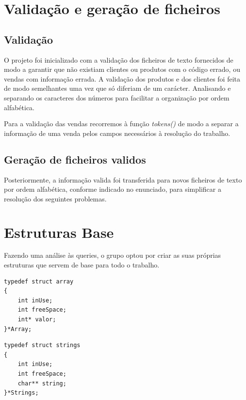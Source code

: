 \documentclass[a4paper]{report} %
\begin{document}
\chapter{Validação e geração de ficheiros}


\section{Validação}
\par O projeto foi inicializado com a validação dos ficheiros de texto fornecidos de modo a garantir que não existiam clientes ou produtos com o código errado, ou vendas com informação errada. A validação dos produtos e dos clientes foi feita de modo semelhantes uma vez que só diferiam de um carácter. Analisando e separando os caracteres dos números para facilitar a organização por ordem alfabética.

\par Para a validação das vendas recorremos à função \emph{tokens()} de modo a separar a informação de uma venda pelos campos necessários à resolução do trabalho.

\section{Geração de ficheiros validos}
Posteriormente, a informação valida foi transferida para novos ficheiros de texto por ordem alfabética, conforme indicado no enunciado, para simplificar a resolução dos seguintes problemas.


\chapter{Estruturas Base}

\par Fazendo uma análise às queries, o grupo optou por criar as suas próprias estruturas que servem de base para todo o trabalho.

\par
\begin{lstlisting}[style=CStyle]
typedef struct array
{
	int inUse;			
	int freeSpace;	
	int* valor;			
}*Array;
\end{lstlisting}

\begin{lstlisting}[style=CStyle]
typedef struct strings
{
	int inUse;			
	int freeSpace;	
	char** string;	
}*Strings;
\end{lstlisting}
\end{document}
